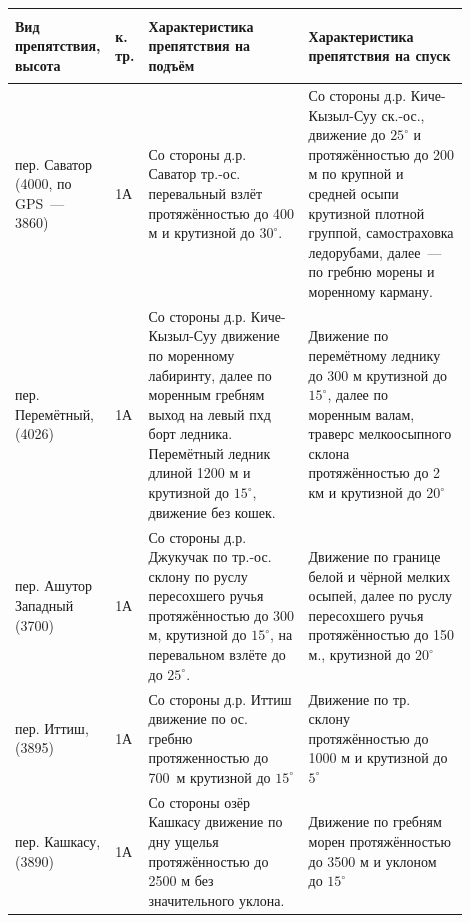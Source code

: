 \begin{table}[h!]
		\begin{tabular}{|>{\centering\arraybackslash}m{0.17\linewidth}|>{\centering\arraybackslash}m{0.03\linewidth}|>{\centering\arraybackslash}m{0.35\linewidth}|>{\centering\arraybackslash}m{0.35\linewidth}|}
			\hline
			\textbf{Вид препятствия, высота} &
			\begin{turn}{90}\textbf{к. тр.}\end{turn} &
			\textbf{Характеристика препятствия на подъём} &
			\textbf{Характеристика препятствия на спуск} \\
			\hline			
			пер. Саватор (4000, по GPS~--- 3860) & 1А &  Со стороны д.р. Саватор тр.-ос. перевальный взлёт протяжённостью до 400 м и крутизной до $30^{\circ}$.  & Со стороны д.р. Киче-Кызыл-Суу ск.-ос., движение до $25^{\circ}$ и протяжённостью до 200 м по крупной и средней осыпи крутизной плотной группой, самостраховка ледорубами, далее~--- по гребню морены и моренному карману.\\
			\hline			
			пер. Перемётный, (4026)  & 1А & Со стороны д.р. Киче-Кызыл-Суу движение по моренному лабиринту, далее по моренным гребням выход на левый пхд борт ледника. Перемётный ледник длиной 1200 м и крутизной  до $15^{\circ}$, движение без кошек. & Движение по перемётному леднику до 300 м  крутизной  до $15^{\circ}$, далее по моренным валам, траверс мелкоосыпного склона протяжённостью до 2 км и крутизной  до $20^{\circ}$ \\
			\hline
			пер. Ашутор Западный (3700)  & 1А & Со стороны д.р. Джукучак по тр.-ос. склону по руслу пересохшего ручья протяжённостью до 300 м, крутизной до $15^{\circ}$, на перевальном взлёте до до $25^{\circ}$. & Движение по границе белой и чёрной мелких осыпей, далее по руслу пересохшего ручья протяжённостью до 150 м., крутизной до $20^{\circ}$\\
			\hline
			пер. Иттиш, (3895)  & 1А & Со стороны д.р. Иттиш движение по ос. гребню протяженностью до 700~м крутизной  до $15^{\circ}$ & Движение по тр. склону протяжённостью до 1000 м и крутизной до $5^{\circ}$\\
			\hline
			пер. Кашкасу, (3890)  & 1А & Со стороны озёр Кашкасу движение по дну ущелья протяжённостью до 2500 м без значительного уклона. &  Движение по гребням морен протяжённостью до 3500 м и уклоном до $15^{\circ}$\\
			\hline
	\end{tabular}%
\end{table}

\clearpage
